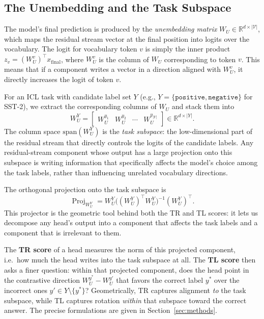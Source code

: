 \documentclass[twoside,english]{article}
\newcommand{\R}{\mathbb{R}}
\begin{document}
\subsection{The Unembedding and the Task Subspace}

The model's final prediction is produced by the \textit{unembedding matrix} $W_U \in \R^{d \times |\mathcal{V}|}$, which maps the residual stream vector at the final position into logits over the vocabulary. The logit for vocabulary token $v$ is simply the inner product $z_v = (W_U^{v})^\top x_{\text{final}}$, where $W_U^{v}$ is the column of $W_U$ corresponding to token $v$. This means that if a component writes a vector in a direction aligned with $W_U^{v}$, it directly increases the logit of token $v$.

For an ICL task with candidate label set $Y$ (e.g., $Y = \{\texttt{positive}, \texttt{negative}\}$ for SST-2), we extract the corresponding columns of $W_U$ and stack them into
\[
W_U^Y = \begin{bmatrix} W_U^{y_1} & W_U^{y_2} & \cdots & W_U^{y_{|Y|}} \end{bmatrix} \in \R^{d \times |Y|}.
\]
The column space $\mathrm{span}(W_U^Y)$ is the \emph{task subspace}: the low-dimensional part of the residual stream that directly controls the logits of the candidate labels. Any residual-stream component whose output has a large projection onto this subspace is writing information that specifically affects the model's choice among the task labels, rather than influencing unrelated vocabulary directions.

The orthogonal projection onto the task subspace is
\[
\operatorname{Proj}_{W_U^Y} = W_U^Y \bigl((W_U^Y)^\top W_U^Y\bigr)^{-1} (W_U^Y)^\top.
\]
This projector is the geometric tool behind both the TR and TL scores: it lets us decompose any head's output into a component that affects the task labels and a component that is irrelevant to them.

The \textbf{TR score} of a head measures the norm of this projected component, i.e.\ how much the head writes into the task subspace at all. The \textbf{TL score} then asks a finer question: within that projected component, does the head point in the contrastive direction $W_U^{y^*} - W_U^{y'}$ that favors the correct label $y^*$ over the incorrect ones $y' \in Y \setminus \{y^*\}$? Geometrically, TR captures alignment \emph{to} the task subspace, while TL captures rotation \emph{within} that subspace toward the correct answer. The precise formulations are given in Section~\ref{sec:methods}.
\end{document}
